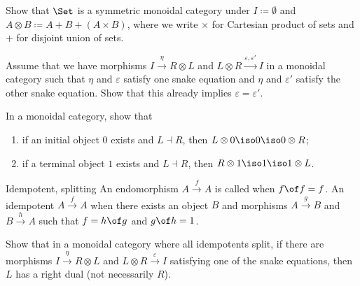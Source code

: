 \begin{exercise}
  Show that $\Set$ is a symmetric monoidal category under $I \coloneqq \emptyset$ and $A \otimes B \coloneqq A + B + (A \times B)$, where we write $\times$ for Cartesian product of sets and $+$ for disjoint union of sets.
\end{exercise}


\begin{exercise}
  Assume that we have morphisms $I \xrightarrow{\eta} R \otimes L$ and $L \otimes R \xrightarrow{\varepsilon, \varepsilon'} I$ in a monoidal category such that $\eta$ and $\varepsilon$ satisfy one snake equation and $\eta$ and $\varepsilon'$ satisfy the other snake equation.
  Show that this already implies $\varepsilon = \varepsilon'$.
\end{exercise}


\begin{exercise}
  In a monoidal category, show that
  \begin{enumerate}
    \item if an initial object $0$ exists and $L \dashv R$, then $L \otimes 0 \iso 0 \iso 0 \otimes R$;
    \item if a terminal object $1$ exists and $L \dashv R$, then $R \otimes 1 \iso 1 \iso 1 \otimes L$.
  \end{enumerate}
\end{exercise}


\begin{definition}{Idempotent, splitting}
  An endomorphism $A \xrightarrow{f} A$ is called  when $f \of f = f$. An idempotent $A \xrightarrow{f} A$  when there exists an object $B$ and morphisms $A \xrightarrow{g} B$ and $B \xrightarrow{h} A$ such that $f = h \of g$ and $g \of h = 1$.
\end{definition}


\begin{exercise}
  Show that in a monoidal category where all idempotents split, if there are morphisms $I \xrightarrow{\eta} R \otimes L$ and $L \otimes R \xrightarrow{\varepsilon} I$ satisfying one of the snake equations, then $L$ has a right dual (not necessarily $R$).
\end{exercise}




